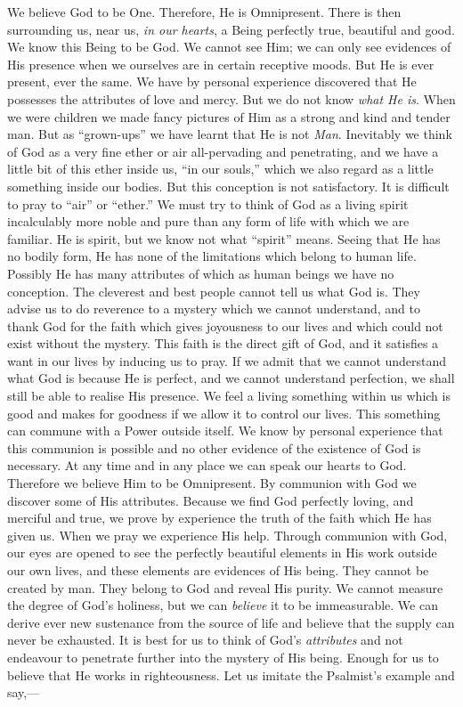 We believe God to be One. Therefore,
He is Omnipresent. There is then  surrounding
us, near us, \textsl{in our hearts}, a Being
perfectly true, beautiful and good. We
know this Being to be God. We cannot
see Him; we can only see evidences of His
presence when we ourselves are in certain
receptive moods. But He is ever present,
ever the same. We have by personal experience
discovered that He possesses the
attributes of love and mercy. But we do
not know \textsl{what He is}. When we were
children we made fancy pictures of Him as
a strong and kind and tender man. But as
“grown-ups” we have learnt that He is not
\textsl{Man}. Inevitably we think of God as a
very fine ether or air all-pervading and penetrating,
and we have a little bit of this ether
inside us, “in our souls,” which we also regard
as a little something inside our bodies.
But this conception is not satisfactory. It is
difficult to pray to “air” or “ether.” We
must try to think of God as a living spirit
incalculably more noble and pure than any
form of life with which we are familiar. He
is spirit, but we know not what “spirit”
means. Seeing that He has no bodily form,
He has none of the limitations which belong
to human life. Possibly He has many attributes
of which as human beings we have no
conception. The cleverest and best people
cannot tell us what God is. They advise
us to do reverence to a mystery which we
cannot understand, and to thank God for the
faith which gives joyousness to our lives and
which could not exist without the mystery.
This faith is the direct gift of God, and it
satisfies a want in our lives by inducing us
to pray. If we admit that we cannot understand
what God is because He is perfect,
and we cannot understand perfection, we
shall still be able to realise His presence.
We feel a living something within us which
is good and makes for goodness if we allow
it to control our lives. This something can
commune with a Power outside itself. We
know by personal experience that this communion
is possible and no other evidence of
the existence of God is necessary. At any
time and in any place we can speak our
hearts to God. Therefore we believe Him
to be Omnipresent. By communion with
God we discover some of His attributes.
Because we find God perfectly loving, and
merciful and true, we prove by experience
the truth of the faith which He has given us.
When we pray we experience His help.
Through communion with God, our eyes are
opened to see the perfectly beautiful elements
in His work outside our own lives, and these
elements are evidences of His being. They
cannot be created by man. They belong to
God and reveal His purity. We cannot
measure the degree of God’s holiness, but
we can \textsl{believe} it to be immeasurable. We
can derive ever new sustenance from the
source of life and believe that the supply
can never be exhausted. It is best for us
to think of God’s \textsl{attributes} and not endeavour
to penetrate further into the mystery
of His being. Enough for us to believe
that He works in righteousness. Let us
imitate the Psalmist’s example and say,—

